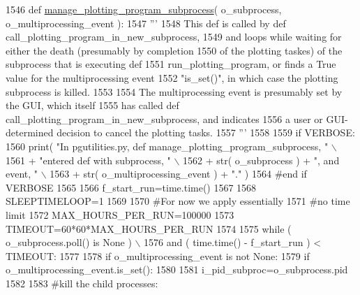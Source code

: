 \begin{DoxyCode}
1546 \textcolor{keyword}{def }\hyperlink{namespacenegui_1_1pgutilities_a27835f7b8bcbb2b3969f5bd2dfd08072}{manage\_plotting\_program\_subprocess}( o\_subprocess, 
      o\_multiprocessing\_event ):
1547     \textcolor{stringliteral}{'''}
1548 \textcolor{stringliteral}{    This def is called by def call\_plotting\_program\_in\_new\_subprocess,}
1549 \textcolor{stringliteral}{    and loops while waiting for either the death (presumably by completion}
1550 \textcolor{stringliteral}{    of the plotting taskes) of the subprocess that is executing def }
1551 \textcolor{stringliteral}{    run\_plotting\_program, or finds a True value for the multiprocessing event }
1552 \textcolor{stringliteral}{    "is\_set()", in which case the plotting subprocess is killed.}
1553 \textcolor{stringliteral}{}
1554 \textcolor{stringliteral}{    The multiprocessing event is presumably set by the GUI, which itself}
1555 \textcolor{stringliteral}{    has called def call\_plotting\_program\_in\_new\_subprocess, and indicates}
1556 \textcolor{stringliteral}{    a user or GUI-determined decision to cancel the plotting tasks.}
1557 \textcolor{stringliteral}{    '''}
1558 
1559     \textcolor{keywordflow}{if} VERBOSE:
1560         print( \textcolor{stringliteral}{"In pgutilities.py, def manage\_plotting\_program\_subprocess, "} \(\backslash\)
1561                             + \textcolor{stringliteral}{"entered def with subprocess, "} \(\backslash\)
1562                             + str( o\_subprocess ) + \textcolor{stringliteral}{", and event, "}  \(\backslash\)
1563                             + str( o\_multiprocessing\_event ) + \textcolor{stringliteral}{"."}  )
1564     \textcolor{comment}{#end if VERBOSE}
1565 
1566     f\_start\_run=time.time()
1567 
1568     SLEEPTIMELOOP=1
1569 
1570     \textcolor{comment}{#For now we apply essentially}
1571     \textcolor{comment}{#no time limit}
1572     MAX\_HOURS\_PER\_RUN=100000
1573     TIMEOUT=60*60*MAX\_HOURS\_PER\_RUN
1574 
1575     \textcolor{keywordflow}{while} ( o\_subprocess.poll() \textcolor{keywordflow}{is} \textcolor{keywordtype}{None} ) \(\backslash\)
1576                         \textcolor{keywordflow}{and} ( time.time() - f\_start\_run ) < TIMEOUT:
1577 
1578         \textcolor{keywordflow}{if} o\_multiprocessing\_event \textcolor{keywordflow}{is} \textcolor{keywordflow}{not} \textcolor{keywordtype}{None}:
1579             \textcolor{keywordflow}{if} o\_multiprocessing\_event.is\_set():
1580 
1581                 i\_pid\_subproc=o\_subprocess.pid
1582 
1583                 \textcolor{comment}{#kill the child processes:}

\end{DoxyCode}
